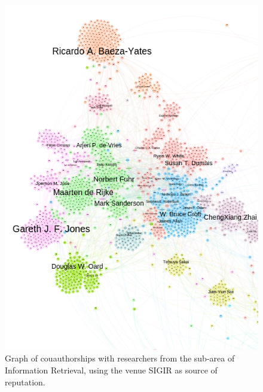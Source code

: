\documentclass[msc]{ppgccufmg}
\begin{document}
\begin{appendices}
\begin{figure}[h]
    \centering
    \includegraphics[scale=0.6]{fig/sigir}
    \caption{Graph of couauthorships with researchers from the sub-area of Information Retrieval, using the venue SIGIR as source of reputation.}
    \label{fig:sigir}
\end{figure}


\end{appendices}
\end{document}
